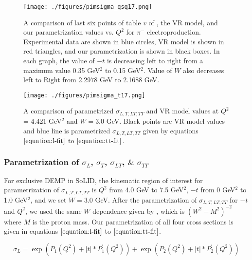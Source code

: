 \begin{figure}[!hbt]
    \centering
    \texttt{[image: ./figures/pimsigma\_qsq17.png]}
    \caption{ A comparison of last six points of table $v$ of \cite{gmhuber-2},
      the VR model, and our parametrization values vs. $Q^{2}$ for $\pi^{-}$
      electroproduction. Experimental data are shown in blue circles, VR model
      is shown in red triangles, and our parametrization is shown in black
      boxes. In each graph, the value of $-t$ is decreasing left to right from
      a maximum value 0.35 GeV$^2$ to 0.15 GeV$^2$. Value of $W$ also decreases
      left to Right from 2.2978 GeV to 2.1688 GeV.}
    \label{fig:expvrfit}
\end{figure}

\begin{figure}[!hbt]
    \centering
    \texttt{[image: ./figures/pimsigma\_t17.png]}
    \caption{ A comparison of parametrized $\sigma_{L,T,LT,TT}$ and VR model
    values at $Q^2$ = 4.421 GeV$^2$ and $W = 3.0$ GeV.  Black points are VR
    model values and blue line is parametrized $\sigma_{L,T,LT,TT}$ given by
    equations $\ref{equation:l-fit}$ to $\ref{equation:tt-fit}$. }
    \label{fig:sigall}
\end{figure}

\subsubsection{Parametrization of $\sigma_{L}$, $\sigma_{T}$, $\sigma_{LT}$, 
$\&$ $\sigma_{TT}$
\label{sec:parametrization}}

For exclusive DEMP in SoLID, the kinematic region of interest for
parametrization of $\sigma_{L,T,LT,TT}$ is $Q^2$ from 4.0 GeV to 7.5 GeV$^2$,
$-t$ from 0 GeV$^2$ to 1.0 GeV$^2$, and we set $W=3.0$ GeV. After the
parametrization of $\sigma_{L,T,LT,TT}$ for $-t$ and $Q^2$, we used the same
$W$ dependence given by \cite{Fpi2}, which is $(W^2-M^2)^{-2}$ where $M$ is
the proton mass.  Our parametrization of all four cross sections is given in
equations $\ref{equation:l-fit}$ to $\ref{equation:tt-fit}$.

\begin{equation}
        \sigma_{L} = \exp{(P_1(Q^2) + |t| * P^{\prime}_1(Q^2))}
        + \exp{(P_2(Q^2) + |t| * P^{\prime}_2(Q^2))}
     \label{equation:l-fit}
\end{equation}

